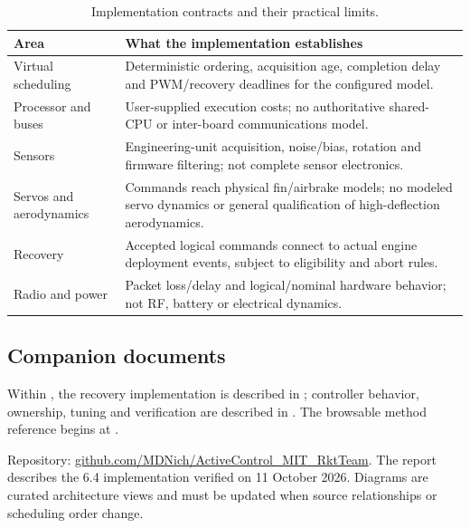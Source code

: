 \begin{table}[htbp]\centering\small
\begin{tabularx}{\linewidth}{@{}L{3.7cm}Y@{}}\toprule
Area & What the implementation establishes\\\midrule
Virtual scheduling & Deterministic ordering, acquisition age, completion delay and PWM/recovery deadlines for the configured model.\\
Processor and buses & User-supplied execution costs; no authoritative shared-CPU or inter-board communications model.\\
Sensors & Engineering-unit acquisition, noise/bias, rotation and firmware filtering; not complete sensor electronics.\\
Servos and aerodynamics & Commands reach physical fin/airbrake models; no modeled servo dynamics or general qualification of high-deflection aerodynamics.\\
Recovery & Accepted logical commands connect to actual engine deployment events, subject to eligibility and abort rules.\\
Radio and power & Packet loss/delay and logical/nominal hardware behavior; not RF, battery or electrical dynamics.\\
\bottomrule\end{tabularx}
\caption{Implementation contracts and their practical limits.}
\end{table}

\subsection{Companion documents}
Within , the recovery implementation is described in
; controller behavior,
ownership, tuning and verification are described in
. The browsable method
reference begins at .

Repository: \href{https://github.com/MDNich/ActiveControl_MIT_RktTeam}{github.com/MDNich/ActiveControl\_MIT\_RktTeam}.
The report describes the 6.4 implementation verified on 11 October 2026.
Diagrams are curated architecture views and must be updated when source
relationships or scheduling order change.
